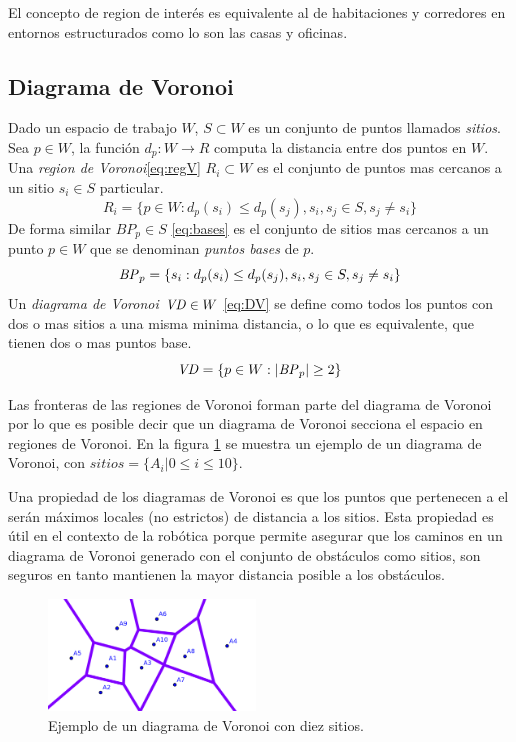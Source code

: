 El concepto de region de interés es equivalente al de habitaciones y corredores en entornos estructurados como lo son las casas y oficinas.

\subsection{Diagrama de Voronoi}\cite{choset2005principles}\cite{Thrun1998}
Dado un espacio de trabajo $W$, $S \subset W$ es un conjunto de puntos llamados \emph{sitios}. Sea $p\in W$, la función $d_p : W \rightarrow R$ computa la distancia entre dos puntos en $W$. Una \emph{region de Voronoi}\ref{eq:regV} $R_i\subset W$ es el conjunto de puntos mas cercanos a un sitio $s_i\in S$ particular.
\begin{equation}
  R_i = \{p \in W : d_p(s_i) \leq d_p(s_j), s_i,s_j\in S,s_j \neq s_i\}\label{eq:regV}
\end{equation}
De forma similar $BP_p \in S$ \ref{eq:bases} es el conjunto de sitios mas cercanos a un punto $p \in W$ que se denominan \emph{puntos bases} de $p$.
\begin{equation}
  \mathit{BP}_p =\{s_i : d_p(s_i) \leq d_p(s_j), s_i,s_j\in S,s_j \neq s_i\}\label{eq:bases}
\end{equation}
Un \emph{diagrama de Voronoi} $\mathit{VD}\in W$ \ref{eq:DV} se define como todos los puntos con dos o mas sitios a una misma minima distancia, o lo que es equivalente, que tienen dos o mas puntos base.
\begin{equation}
  \mathit{VD} = \{p \in W : |\mathit{BP}_p| \geq 2\}\label{eq:DV}
\end{equation}

Las fronteras de las regiones de Voronoi forman parte del diagrama de Voronoi por lo que es posible decir que un diagrama de Voronoi secciona el espacio en regiones de Voronoi. En la figura \ref{fig:ejemploVoronoi} se muestra un ejemplo de un diagrama de Voronoi, con $sitios=\{A_i | 0\leq i \leq 10\}$.

Una propiedad de los diagramas de Voronoi es que los puntos que pertenecen a el serán máximos locales (no estrictos) de distancia a los sitios. Esta propiedad es útil en el contexto de la robótica porque permite asegurar que los caminos en un diagrama de Voronoi generado con el conjunto de obstáculos como sitios, son seguros en tanto mantienen la mayor distancia posible a los obstáculos.

\begin{figure}[ht]
  \center
  \includegraphics[width=5.5cm]{imagenes/VD.png}
  \caption{Ejemplo de un diagrama de Voronoi con diez sitios.\cite{voronoigeo}}\label{fig:ejemploVoronoi}
\end{figure} 

